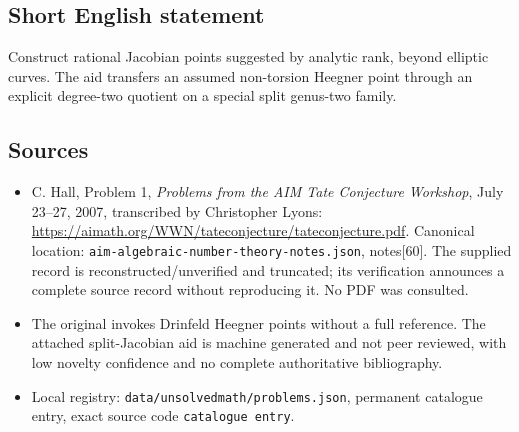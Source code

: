 \documentclass[11pt]{article}
\begin{document}
\subsection{Short English statement}
Construct rational Jacobian points suggested by analytic rank, beyond elliptic curves. The aid transfers an assumed non-torsion Heegner point through an explicit degree-two quotient on a special split genus-two family.
\subsection{Sources}
\begin{itemize}
\item C. Hall, Problem 1, \emph{Problems from the AIM Tate Conjecture Workshop}, July 23--27, 2007, transcribed by Christopher Lyons: \url{https://aimath.org/WWN/tateconjecture/tateconjecture.pdf}. Canonical location: \texttt{aim-algebraic-number-theory-notes.json}, notes[60]. The supplied record is reconstructed/unverified and truncated; its verification announces a complete source record without reproducing it. No PDF was consulted.
\item The original invokes Drinfeld Heegner points without a full reference. The attached split-Jacobian aid is machine generated and not peer reviewed, with low novelty confidence and no complete authoritative bibliography.
\item Local registry: \texttt{data/unsolvedmath/problems.json}, permanent catalogue entry, exact source code \texttt{catalogue entry}.
\end{itemize}
\end{document}
